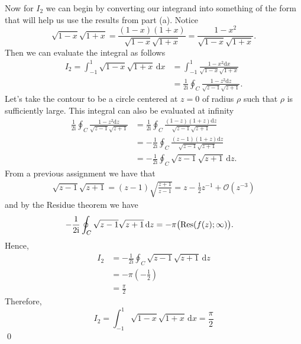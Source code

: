 \documentclass[10pt]{amsart}
\newcommand{\D}{\mathrm{d}}
\newcommand{\I}{\mathrm{i}}
\theoremstyle{nonumberplain}
\begin{document}
\begin{enumerate}[label={\bf {\arabic*}:}]
\begin{enumerate}
\noindent
Now for $I_2$ we can begin by converting our integrand into something of the form that will help us use the results from part (a). Notice
$$
\sqrt{1 - x} \sqrt{1 + x} = \frac{(1 - x)(1 + x)}{\sqrt{1 - x} \sqrt{1 + x}} = \frac{1 - x^2}{\sqrt{1 - x} \sqrt{1 + x}}.
$$
Then we can evaluate the integral as follows
\begin{align*}
I_2 = \int_{-1}^1 \sqrt{1 -x} \sqrt{1 + x}\, \D x &= \int_{-1}^1 \frac{1 - x^2 \D x}{\sqrt{1 - x} \sqrt{1 + x}} \\
	&= \frac{1}{2\I} \oint_C \frac{1 - z^2\D z}{\sqrt{z -1} \sqrt{z + 1}}.
\end{align*}
Let's take the contour to be a circle centered at $z=0$ of radius $\rho$ such that $\rho$ is sufficiently large.
This integral can also be evaluated at infinity
\begin{align*} 
\frac{1}{2\I} \oint_C \frac{1 - z^2\D z}{\sqrt{z -1} \sqrt{z + 1}} 
	&= \frac{1}{2\I} \oint_C \frac{(1 - z)(1 + z)\D z}{\sqrt{z -1} \sqrt{z + 1}} \\
	&= - \frac{1}{2\I} \oint_C \frac{(z - 1)(1 + z)\D z}{\sqrt{z -1} \sqrt{z + 1}} \\
	&= - \frac{1}{2\I} \oint_C \sqrt{z -1} \sqrt{z + 1}\, \D z.
\end{align*}
From a previous assignment we have that 
\begin{align}
\sqrt{z -1} \sqrt{z + 1} = (z - 1) \sqrt{ \frac {z + 1}{z - 1} } = z - \frac 1 2 z^{-1} + \mathcal O(z^{-3})
\label{eq:taylor_previous}
\end{align}
and by the Residue theorem we have
\begin{align*}
- \frac{1}{2\I} \oint_C \sqrt{z -1} \sqrt{z + 1}\, \D z
	&= -\pi \big( {\rm Res}( f(z); \infty) \big).
\end{align*}
Hence,
\begin{align*}
I_2 &= - \frac{1}{2\I} \oint_C \sqrt{z -1} \sqrt{z + 1}\, \D z \\
	&= -\pi \left( - \frac 1 2 \right) \\
	&= \frac \pi 2
\end{align*}
Therefore,
$$
I_2 = \int_{-1}^1 \sqrt{1 -x} \sqrt{1 + x}\, \D x = \frac \pi 2
$$ \qed \\


\end{enumerate}
\end{enumerate}
\end{document}
